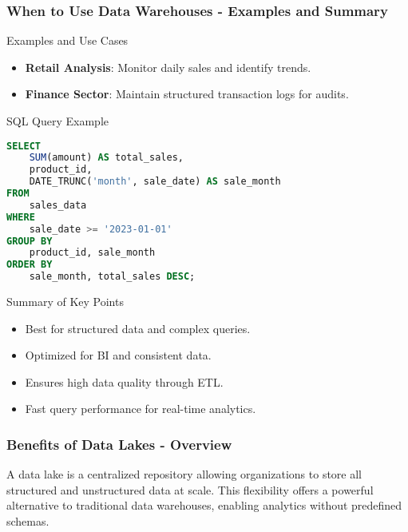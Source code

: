 \documentclass[aspectratio=169]{beamer}
\begin{document}
\begin{frame}[fragile]
  \frametitle{When to Use Data Warehouses - Examples and Summary}
  \begin{block}{Examples and Use Cases}
    \begin{itemize}
      \item \textbf{Retail Analysis}: Monitor daily sales and identify trends.
      \item \textbf{Finance Sector}: Maintain structured transaction logs for audits.
    \end{itemize}
  \end{block}

  \begin{block}{SQL Query Example}
    \begin{lstlisting}[language=SQL]
SELECT 
    SUM(amount) AS total_sales,
    product_id,
    DATE_TRUNC('month', sale_date) AS sale_month
FROM 
    sales_data
WHERE 
    sale_date >= '2023-01-01'
GROUP BY 
    product_id, sale_month
ORDER BY 
    sale_month, total_sales DESC;
    \end{lstlisting}
  \end{block}
  
  \begin{block}{Summary of Key Points}
    \begin{itemize}
      \item Best for structured data and complex queries.
      \item Optimized for BI and consistent data.
      \item Ensures high data quality through ETL.
      \item Fast query performance for real-time analytics.
    \end{itemize}
  \end{block}
\end{frame}

\begin{frame}[fragile]
    \frametitle{Benefits of Data Lakes - Overview}
    A data lake is a centralized repository allowing organizations to store all structured and unstructured data at scale. This flexibility offers a powerful alternative to traditional data warehouses, enabling analytics without predefined schemas.
\end{frame}
\end{document}
